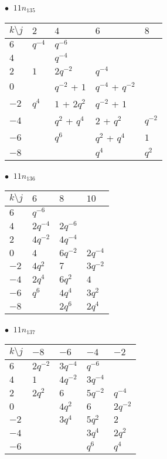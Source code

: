 %
\begin{minipage}{\linewidth}
$\bullet\ $ $11n_{135}$ \vspace{0.5em} \\
\begin{tabular}{l|llll}
$k \setminus j$ & $2$ & $4$ & $6$ & $8$ \\
\hline
$6$ & $q^{-4}$ & $q^{-6}$ &  &  \\
$4$ &  & $q^{-4}$ &  &  \\
$2$ & $1$ & $2q^{-2}$ & $q^{-4}$ &  \\
$0$ &  & $q^{-2}$ + $1$ & $q^{-4}$ + $q^{-2}$ &  \\
$-2$ & $q^{4}$ & $1$ + $2q^{2}$ & $q^{-2}$ + $1$ &  \\
$-4$ &  & $q^{2}$ + $q^{4}$ & $2$ + $q^{2}$ & $q^{-2}$ \\
$-6$ &  & $q^{6}$ & $q^{2}$ + $q^{4}$ & $1$ \\
$-8$ &  &  & $q^{4}$ & $q^{2}$ \\
\end{tabular}
\vspace{2em}
\end{minipage}
%
\begin{minipage}{\linewidth}
$\bullet\ $ $11n_{136}$ \vspace{0.5em} \\
\begin{tabular}{l|lll}
$k \setminus j$ & $6$ & $8$ & $10$ \\
\hline
$6$ & $q^{-6}$ &  &  \\
$4$ & $2q^{-4}$ & $2q^{-6}$ &  \\
$2$ & $4q^{-2}$ & $4q^{-4}$ &  \\
$0$ & $4$ & $6q^{-2}$ & $2q^{-4}$ \\
$-2$ & $4q^{2}$ & $7$ & $3q^{-2}$ \\
$-4$ & $2q^{4}$ & $6q^{2}$ & $4$ \\
$-6$ & $q^{6}$ & $4q^{4}$ & $3q^{2}$ \\
$-8$ &  & $2q^{6}$ & $2q^{4}$ \\
\end{tabular}
\vspace{2em}
\end{minipage}
%
\begin{minipage}{\linewidth}
$\bullet\ $ $11n_{137}$ \vspace{0.5em} \\
\begin{tabular}{l|llll}
$k \setminus j$ & $-8$ & $-6$ & $-4$ & $-2$ \\
\hline
$6$ & $2q^{-2}$ & $3q^{-4}$ & $q^{-6}$ &  \\
$4$ & $1$ & $4q^{-2}$ & $3q^{-4}$ &  \\
$2$ & $2q^{2}$ & $6$ & $5q^{-2}$ & $q^{-4}$ \\
$0$ &  & $4q^{2}$ & $6$ & $2q^{-2}$ \\
$-2$ &  & $3q^{4}$ & $5q^{2}$ & $2$ \\
$-4$ &  &  & $3q^{4}$ & $2q^{2}$ \\
$-6$ &  &  & $q^{6}$ & $q^{4}$ \\
\end{tabular}
\vspace{2em}
\end{minipage}
